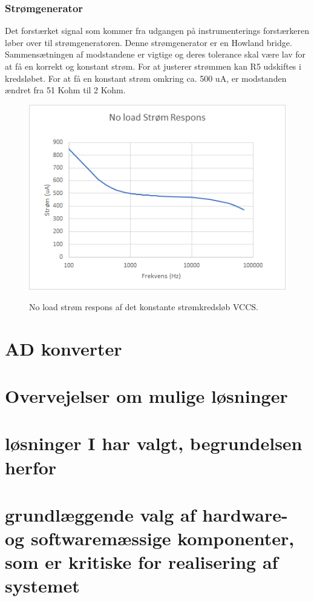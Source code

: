 \documentclass[main.tex]{subfiles}
\begin{document}
\subsubsection{Strømgenerator}
Det forstærket signal som kommer fra udgangen på instrumenterings forstærkeren løber over til strømgeneratoren. Denne strømgenerator er en Howland bridge. Sammensætningen af modstandene er vigtige og deres tolerance skal være lav for at få en korrekt og konstant strøm. For at justerer strømmen kan R5 udskiftes i kredsløbet. For at få en konstant strøm omkring ca. 500 uA, er modstanden ændret fra 51 Kohm til 2 Kohm.  

\begin{figure}[H]
\centering
{\includegraphics[width=12cm]
{Figure/stromfrekvens}}
\caption{No load strøm respons af det konstante strømkredsløb VCCS. }
\label{stromfrekvens}
\end{figure}



\section{AD konverter}
\section{Overvejelser om mulige løsninger}
\section{løsninger I har valgt, begrundelsen herfor}
\section{grundlæggende valg af hardware- og softwaremæssige komponenter, som er kritiske for realisering af systemet}
\end{document}
